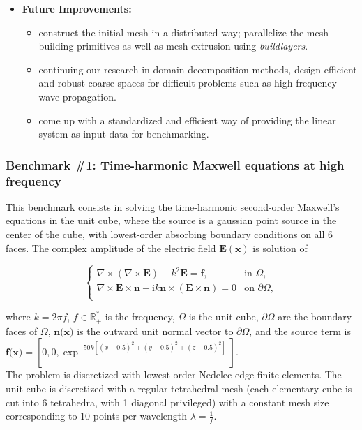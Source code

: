 \begin{itemize}
\begin{itemize}
        \end{itemize}
    \item \textbf{Future Improvements:}
        \begin{itemize}
        \item construct the initial mesh in a distributed way; parallelize the mesh building primitives as well as mesh extrusion using \textit{buildlayers}.
        \item continuing our research in domain decomposition methods, design efficient and robust coarse spaces for difficult problems such as high-frequency wave propagation.
        \item come up with a standardized and efficient way of providing the linear system as input data for benchmarking.
        \end{itemize}
\end{itemize}

\subsubsection{Benchmark \#1: Time-harmonic Maxwell equations at high frequency}

This benchmark consists in solving the time-harmonic second-order Maxwell's equations in the unit cube, where the source is a gaussian point source in the center of the cube, with lowest-order absorbing boundary conditions on all 6 faces. The complex amplitude of the electric field $\mathbf{E(x)}$ is solution of

\begin{equation}
  \begin{cases}
\nabla\times(\nabla\times \mathbf{E})- k^2 \mathbf{E} = \mathbf{f}, & \text{in } \Omega,\\
\nabla\times \mathbf{E}\times \textbf{n}+ \mathrm{i} k \textbf{n} \times (\mathbf{E}\times \textbf{n}) = 0 & \text{on } \partial\Omega,\\
  \end{cases}
\end{equation}

where $k = 2\pi f$, $f \in \mathbb{R}^*_+$ is the frequency, $\Omega$ is the unit cube, $\partial\Omega$ are the boundary faces of $\Omega$, $\textbf{n(x)}$ is the outward unit normal vector to $\partial\Omega$, and the source term is $\textbf{f(x)} = [0,0,\exp^{-50 k [(x-0.5)^2 + (y-0.5)^2 + (z-0.5)^2]}]$.\\
The problem is discretized with lowest-order Nedelec edge finite elements. The unit cube is discretized with a regular tetrahedral mesh (each elementary cube is cut into 6 tetrahedra, with 1 diagonal privileged) with a constant mesh size corresponding to 10 points per wavelength $\lambda = \frac{1}{f}$.



